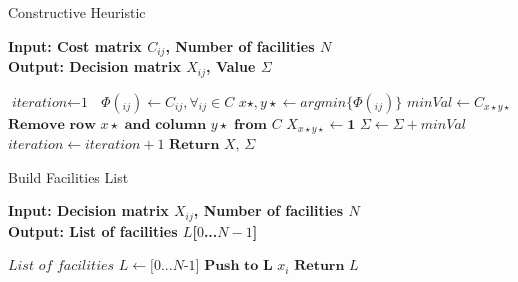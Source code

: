 \documentclass{article}
\begin{document}
    \begin{algorithm}
    \caption{Constructive Heuristic}\label{cons}
    \hspace*{\algorithmicindent} \textbf{Input: Cost matrix $C_{ij}$, Number of facilities $N$} \\
    \hspace*{\algorithmicindent} \textbf{Output: Decision matrix $X_{ij}$, Value $\Sigma$ } 
    \begin{algorithmic}[1]
    \State $\textit{iteration} \gets \textit{1 }$
        \State $\textit{$\Phi(_{ij})$} \gets  \textit{$C_{ij}, \forall_{ij} \in C$}$
        \State $\textit{$x\star, y\star $} \gets \textit{argmin\{$\Phi(_{ij})$\}}$
        \State $\textit{$minVal$} \gets \textit{$C_{x\star y\star}$}$
        \State $\textbf{Remove row $x\star$ and column $y\star$ from $C$}$
        \State $\textit{$X_{x\star y\star}$} \gets \textbf{1}$
        \State $\textit{$\Sigma$} \gets \textit{$\Sigma + minVal$}$
        \State $\textit{$iteration$} \gets \textit{$iteration + 1$}$
    \EndWhile
    \State $\textbf{Return $X$, $\Sigma$}$
    \EndProcedure
    \end{algorithmic}
    \end{algorithm}
    
    \begin{algorithm}
    \caption{Build Facilities List}\label{helper}
    \hspace*{\algorithmicindent} \textbf{Input: Decision matrix $X_{ij}$, Number of facilities $N$} \\
    \hspace*{\algorithmicindent} \textbf{Output: List of facilities $L$[$0$...$N-1$]} 
    \begin{algorithmic}[1]
    \State $\textit{List of facilities $L$} \gets \textit{$[$0$...$N-1$]$}$
            \State $\textbf{Push to L } \textit{$x_i$}$
        \EndIf
    \EndFor
    \State $\textbf{Return $L$}$
    \EndProcedure
    \end{algorithmic}
    \end{algorithm}
\end{document}
